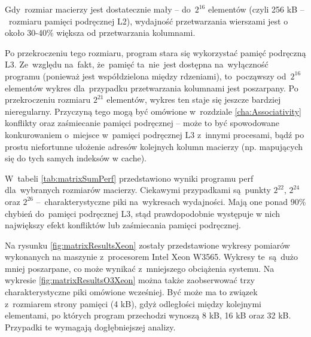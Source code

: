 Gdy~rozmiar macierzy jest dostatecznie mały -- do~$2^{16}$ elementów (czyli 256 kB --~rozmiaru pamięci podręcznej L2), wydajność przetwarzania wierszami jest o około 30-40\% większa od przetwarzania kolumnami.

Po przekroczeniu tego rozmiaru, program stara się wykorzystać pamięć podręczną L3. Ze~względu na~fakt, że~pamięć ta~nie~jest dostępna na~wyłączność programu (ponieważ jest współdzielona między rdzeniami), to~począwszy od~$2^{16}$ elementów wykres dla~przypadku przetwarzania kolumnami jest poszarpany. Po przekroczeniu rozmiaru $2^{21}$ elementów, wykres ten staje się jeszcze bardziej nieregularny. Przyczyną tego mogą być omówione w~rozdziale \ref{cha:Associativity} konflikty oraz zaśmiecanie pamięci podręcznej -- może to być spowodowane konkurowaniem o~miejsce w~pamięci podręcznej L3 z~innymi procesami, bądź po prostu niefortunne ułożenie adresów kolejnych kolumn macierzy (np. mapujących się do tych samych indeksów w cache).

W~tabeli \ref{tab:matrixSumPerf} przedstawiono wyniki programu perf dla~wybranych rozmiarów macierzy. Ciekawymi przypadkami są~punkty $2^{22}$, $2^{24}$ oraz $2^{26}$ --~charakterystyczne piki na~wykresach wydajności. Mają one ponad 90\% chybień do~pamięci podręcznej L3, stąd prawdopodobnie występuje w nich największy efekt konfliktów lub zaśmiecania pamięci podręcznej.

Na rysunku \ref{fig:matrixResultsXeon} zostały przedstawione wykresy pomiarów wykonanych na maszynie z~procesorem Intel Xeon W3565. Wykresy te~są~dużo mniej poszarpane, co może wynikać z~mniejszego obciążenia systemu. Na wykresie \ref{fig:matrixResultsO3Xeon} można także zaobserwować trzy charakterystyczne piki omówione wcześniej. Być może ma to związek z~rozmiarem strony pamięci (4 kB), gdyż odległości między kolejnymi elementami, po których program przechodzi wynoszą 8 kB, 16 kB oraz 32 kB. Przypadki te wymagają dogłębniejszej analizy.


